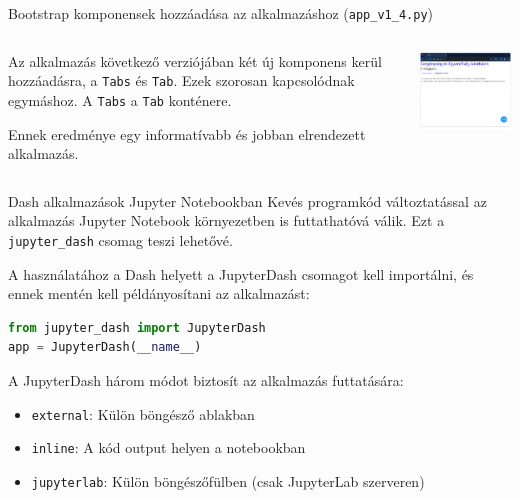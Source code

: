 \documentclass[english, aspectratio=169]{beamer}
\begin{document}
	\begin{frame}[fragile]{Bootstrap komponensek hozzáadása az alkalmazáshoz (\texttt{app\_v1\_4.py})}
		\begin{columns}
			\begin{column}{.5\textwidth}
				Az alkalmazás következő verziójában két új komponens kerül hozzáadásra, a \texttt{Tabs} és \texttt{Tab}. Ezek szorosan kapcsolódnak egymáshoz. A \texttt{Tabs} a \texttt{Tab} konténere.\par\smallskip
				Ennek eredménye egy informatívabb és jobban elrendezett alkalmazás. 
			\end{column}
			\begin{column}{.5\textwidth}
				\begin{center}
					\includegraphics[width=6cm, keepaspectratio]{images/dash_11.png}
				\end{center}
			\end{column}
		\end{columns}
	\end{frame}
	
	\begin{frame}[fragile]{Dash alkalmazások Jupyter Notebookban}
		Kevés programkód változtatással az alkalmazás Jupyter Notebook környezetben is futtathatóvá válik. Ezt a \texttt{jupyter\_dash} csomag teszi lehetővé.\par\smallskip
		A használatához a Dash helyett a JupyterDash csomagot kell importálni, és ennek mentén kell példányosítani az alkalmazást:
		\begin{lstlisting}[language=python]
from jupyter_dash import JupyterDash
app = JupyterDash(__name__)
		\end{lstlisting}
		A JupyterDash három módot biztosít az alkalmazás futtatására:
		\begin{itemize}
			\item \texttt{external}: Külön böngésző ablakban
			\item \texttt{inline}: A kód output helyen a notebookban
			\item \texttt{jupyterlab}: Külön böngészőfülben (csak JupyterLab szerveren)
		\end{itemize}
	\end{frame}
	
\end{document}
